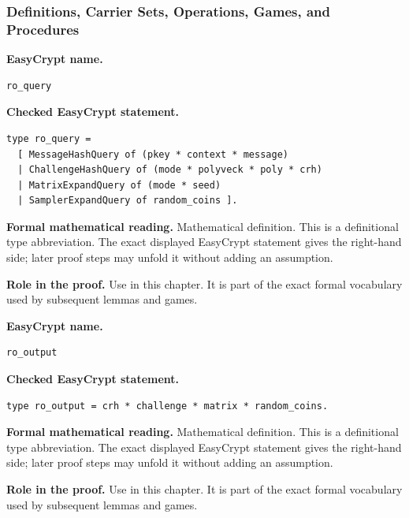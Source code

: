 \subsubsection*{Definitions, Carrier Sets, Operations, Games, and Procedures}
\begin{formaldefinition}
\noindent\textbf{EasyCrypt name.}
\begin{lstlisting}[language=EasyCrypt,basicstyle=\ttfamily\scriptsize]
ro_query
\end{lstlisting}
\noindent\textbf{Checked EasyCrypt statement.}
\begin{lstlisting}[language=EasyCrypt,basicstyle=\ttfamily\scriptsize]
type ro_query =
  [ MessageHashQuery of (pkey * context * message)
  | ChallengeHashQuery of (mode * polyveck * poly * crh)
  | MatrixExpandQuery of (mode * seed)
  | SamplerExpandQuery of random_coins ].
\end{lstlisting}
\noindent\textbf{Formal mathematical reading.}
Mathematical definition. This is a definitional type abbreviation.  The exact displayed EasyCrypt statement gives the right-hand side; later proof steps may unfold it without adding an assumption.

\noindent\textbf{Role in the proof.}
Use in this chapter. It is part of the exact formal vocabulary used by subsequent lemmas and games.

\end{formaldefinition}

\begin{formaldefinition}
\noindent\textbf{EasyCrypt name.}
\begin{lstlisting}[language=EasyCrypt,basicstyle=\ttfamily\scriptsize]
ro_output
\end{lstlisting}
\noindent\textbf{Checked EasyCrypt statement.}
\begin{lstlisting}[language=EasyCrypt,basicstyle=\ttfamily\scriptsize]
type ro_output = crh * challenge * matrix * random_coins.
\end{lstlisting}
\noindent\textbf{Formal mathematical reading.}
Mathematical definition. This is a definitional type abbreviation.  The exact displayed EasyCrypt statement gives the right-hand side; later proof steps may unfold it without adding an assumption.

\noindent\textbf{Role in the proof.}
Use in this chapter. It is part of the exact formal vocabulary used by subsequent lemmas and games.

\end{formaldefinition}

